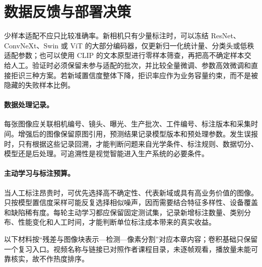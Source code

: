 \section{数据反馈与部署决策}
少样本适配不应只比较准确率。新相机只有少量标注时，可以冻结 ResNet、ConvNeXt、Swin 或 ViT 的大部分编码器，仅更新归一化统计量、分类头或低秩适配参数；也可以使用 CLIP 的文本原型进行零样本筛查，再把高不确定样本交给人工。验证时必须保留未参与适配的批次，并比较全量微调、参数高效微调和直接拒识三种方案。若新域置信度整体下降，拒识率应作为业务容量约束，而不是被隐藏的失败样本比例。

\paragraph{数据处理记录。}
每张图像应关联相机编号、镜头、曝光、生产批次、工件编号、标注版本和采集时间。增强后的图像保留原图引用，预测结果记录模型版本和预处理参数。发生误报时，只有根据这些记录回溯，才能判断问题来自光学条件、标注规则、数据切分、模型还是后处理。可追溯性是视觉智能进入生产系统的必要条件。

\paragraph{主动学习与标注预算。}
当人工标注昂贵时，可优先选择高不确定性、代表新域或具有高业务价值的图像。只按模型置信度采样可能反复选择相似噪声，因而需要结合特征多样性、设备覆盖和缺陷稀有度。每轮主动学习都应保留固定测试集，记录新增标注数量、类别分布、性能变化和人工时间，才能判断单位标注成本带来的真实收益。

以下材料按“残差与图像块表示—检测—像素分割”对应本章内容；卷积基础只保留一个复习入口。视频名称与链接已对照作者课程目录，未逐帧观看，播放量未能可靠核实，故不作热度排序。
